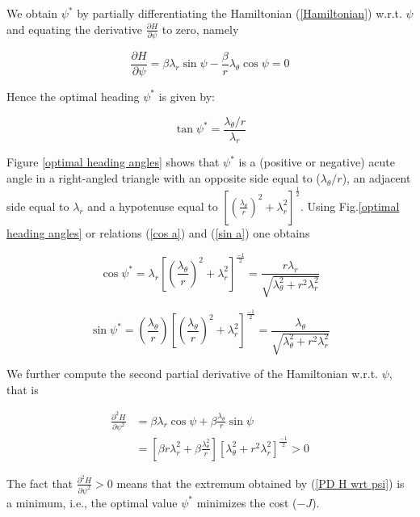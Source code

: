 We obtain $\psi^*$ by partially differentiating the Hamiltonian (\ref{Hamiltonian}) w.r.t. $\psi$ and equating the derivative $\frac{\partial H}{\partial \psi}$ to zero, namely 

\begin{equation}
	\frac{\partial H}{\partial \psi} = \beta \lambda_r \sin \psi - \frac{\beta}{r} \lambda_\theta \cos \psi = 0 
\label{PD H wrt psi}
\end{equation}

Hence the optimal heading $\psi^*$ is given by:

\begin{equation}
	\tan \psi^* = \dfrac{\lambda_\theta / r}{\lambda_r}
\label{tan psi}
 \end{equation}
 
 Figure \ref{optimal heading angles} shows that $\psi^*$ is a (positive or negative) acute angle in a right-angled triangle with an opposite side equal to ($\lambda_\theta / r$), an adjacent side equal to $\lambda_r$ and a hypotenuse equal to $[(\frac{\lambda_\theta}{r})^2 + \lambda_r^2]^\frac{1}{2}$. Using Fig.\ref{optimal heading angles} or relations (\ref{cos a}) and (\ref{sin a}) one obtains 
 
\begin{equation}
 	\cos \psi^* = \lambda_r [(\frac{\lambda_\theta}{r})^2 + \lambda_r^2]^\frac{-1}{2} 
 	= \dfrac{r \lambda_r}{\sqrt{\lambda_\theta ^2 + r^2 \lambda_r ^2}}
\label{cos psi}
\end{equation}

\begin{equation}
\sin \psi^* = (\frac{\lambda_\theta}{r}) [(\frac{\lambda_\theta}{r})^2 + \lambda_r^2]^\frac{-1}{2} 
= \dfrac{\lambda_\theta}{\sqrt{\lambda_\theta ^2 + r^2 \lambda_r ^2}}
\label{sin psi}
\end{equation}

We further compute the second partial derivative of the Hamiltonian w.r.t. $\psi$, that is 

\begin{equation}
\begin{split}
\frac{\partial^2 H}{\partial \psi^2}& = \beta \lambda_r \cos \psi + \beta \frac{\lambda_\theta }{r} \sin \psi \\
&= [\beta r \lambda^2 _ r + \beta \frac{\lambda^2 _ \theta}{r}][\lambda^2_\theta + r^2 \lambda^2_r]^\frac{-1}{2} > 0
\end{split}
\end{equation}

The fact that $\frac{\partial^2 H}{\partial \psi^2}>0$ means that the extremum obtained by (\ref{PD H wrt psi}) is a minimum, i.e., the optimal value $\psi^*$ minimizes the cost ($-J$).


